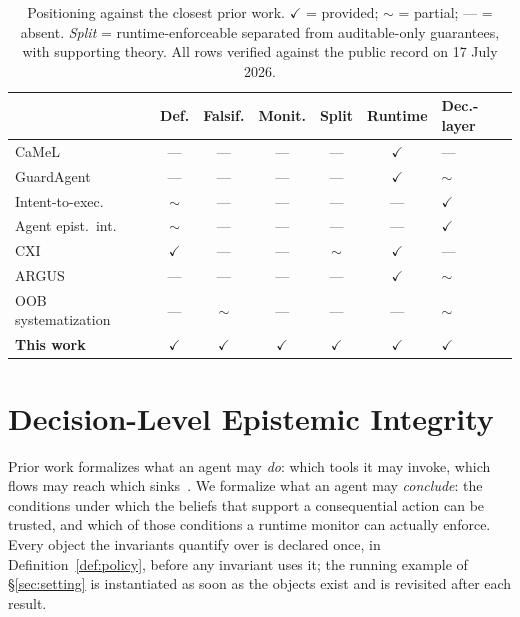 \documentclass[conference,compsoc]{IEEEtran}
\theoremstyle{definition}
\theoremstyle{plain}
\newcommand{\tick}{\ensuremath{\checkmark}}
\newcommand{\partl}{\ensuremath{\sim}}
\newcommand{\absent}{---}
\begin{document}
\begin{table}[t]
\centering
\caption{Positioning against the closest prior work.
$\tick$ = provided; $\partl$ = partial; --- = absent.
\emph{Split} = runtime-enforceable separated from auditable-only
guarantees, with supporting theory. All rows verified against the
public record on 17 July 2026.}
\label{tab:positioning}
\scriptsize
\setlength{\tabcolsep}{3pt}
\begin{tabularx}{\columnwidth}{@{}>{\raggedright\arraybackslash}X c c c c c >{\centering\arraybackslash}p{1.05cm}@{}}
\toprule
& Def. & Falsif. & Monit. & Split & Runtime & Dec.-layer \\
\midrule
CaMeL~\cite{camel} & \absent & \absent & \absent & \absent & \tick & \absent \\
GuardAgent~\cite{guardagent} & \absent & \absent & \absent & \absent & \tick & \partl \\
Intent-to-exec.~\cite{qu} & \partl & \absent & \absent & \absent & \absent & \tick \\
Agent epist.\ int.~\cite{shen} & \partl & \absent & \absent & \absent & \absent & \tick \\
CXI~\cite{cxi} & \tick & \absent & \absent & \partl & \tick & \absent \\
ARGUS~\cite{argus} & \absent & \absent & \absent & \absent & \tick & \partl \\
OOB systematization~\cite{oob} & \absent & \partl & \absent & \absent & \absent & \partl \\
\midrule
\textbf{This work} & \tick & \tick & \tick & \tick & \tick & \tick \\
\bottomrule
\end{tabularx}
\end{table}


\section{Decision-Level Epistemic Integrity}
\label{sec:definition}
Prior work formalizes what an agent may \emph{do}: which tools it may
invoke, which flows may reach which sinks~\cite{camel,cxi,argus}. We
formalize what an agent may \emph{conclude}: the conditions under which
the beliefs that support a consequential action can be trusted, and
which of those conditions a runtime monitor can actually enforce. Every
object the invariants quantify over is declared once, in
Definition~\ref{def:policy}, before any invariant uses it; the running
example of \S\ref{sec:setting} is instantiated as soon as the objects
exist and is revisited after each result.
\end{document}
